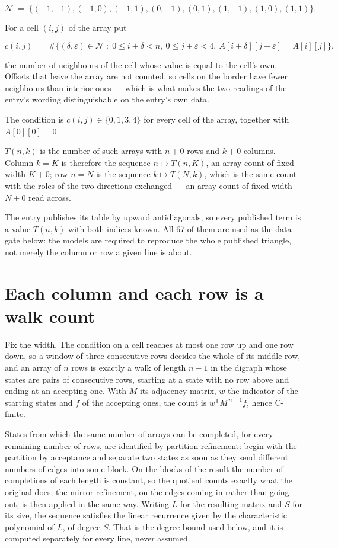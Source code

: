 \documentclass[11pt]{article}
\theoremstyle{definition}
\begin{document}
\[\mathcal{N} \;=\; \{(-1,-1), (-1,0), (-1,1), (0,-1), (0,1), (1,-1), (1,0), (1,1)\}.\]

For a cell $(i,j)$ of the array put

\[c(i,j) \;=\; \#\bigl\{(\delta,\varepsilon)\in\mathcal{N} \;:\; 0\le i+\delta<n,\ 0\le j+\varepsilon<4,\ A[i+\delta][j+\varepsilon] = A[i][j]\bigr\},\]

the number of neighbours of the cell whose value is equal to the cell's own. Offsets that leave the array are not counted, so cells on the border have fewer neighbours than interior ones --- which is what makes the two readings of the entry's wording distinguishable on the entry's own data.

The condition is $c(i,j) \in \{0, 1, 3, 4\}$ for every cell of the array, together with $A[0][0]=0$.

$T(n,k)$ is the number of such arrays with $n + 0$ rows and $k + 0$ columns. Column $k = K$ is therefore the sequence $n \mapsto T(n,K)$, an array count of fixed width $K + 0$; row $n = N$ is the sequence $k \mapsto T(N,k)$, which is the same count with the roles of the two directions exchanged --- an array count of fixed width $N + 0$ read across.

The entry publishes its table by upward antidiagonals, so every published term is a value $T(n,k)$ with both indices known. All 67 of them are used as the data gate below: the models are required to reproduce the whole published triangle, not merely the column or row a given line is about.

\section{Each column and each row is a walk count}

Fix the width. The condition on a cell reaches at most one row up and one row down, so a window of three consecutive rows decides the whole of its middle row, and an array of $n$ rows is exactly a walk of length $n-1$ in the digraph whose states are pairs of consecutive rows, starting at a state with no row above and ending at an accepting one. With $M$ its adjacency matrix, $w$ the indicator of the starting states and $f$ of the accepting ones, the count is $w^{\mathsf T}M^{\,n-1}f$, hence C-finite.

States from which the same number of arrays can be completed, for every remaining number of rows, are identified by partition refinement: begin with the partition by acceptance and separate two states as soon as they send different numbers of edges into some block. On the blocks of the result the number of completions of each length is constant, so the quotient counts exactly what the original does; the mirror refinement, on the edges coming in rather than going out, is then applied in the same way. Writing $L$ for the resulting matrix and $S$ for its size, the sequence satisfies the linear recurrence given by the characteristic polynomial of $L$, of degree $S$. That is the degree bound used below, and it is computed separately for every line, never assumed.
\end{document}
